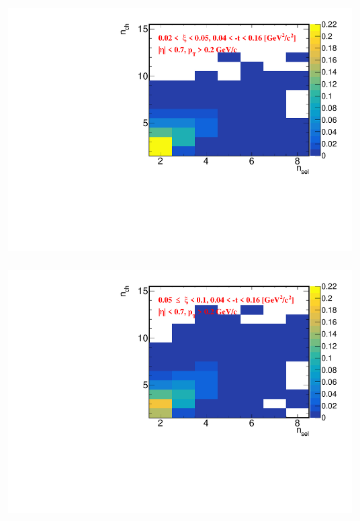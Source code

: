 \begin{figure}[t!]
	\centering
	\begin{subfigure}{.49\textwidth}
		\includegraphics[width=\textwidth,page=1]{chapters/chrgSTAR/img/unfolding/matrix_0.pdf}
	\end{subfigure}
	\hfill
	\begin{subfigure}{.49\textwidth}
		\includegraphics[width=\textwidth,page=1]{chapters/chrgSTAR/img/unfolding/matrix_1.pdf}
	\end{subfigure}
	\begin{subfigure}{.49\textwidth}

\end{subfigure}
\end{figure}
